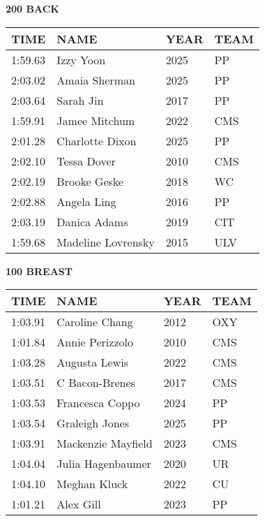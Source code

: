 \begin{table}[H]
\centering
\begin{minipage}[t]{0.48\textwidth}
\centering
\textbf{200 BACK}\\[0.1cm]
\begin{tabular}{@{}p{1.8cm}p{2.8cm}p{1.2cm}p{1.4cm}@{}}
\hline
    \textbf{TIME} & \textbf{NAME} & \textbf{YEAR} & \textbf{TEAM} \\
\hline
    1:59.63 & Izzy Yoon & 2025 & PP \\
    2:03.02 & Amaia Sherman & 2025 & PP \\
    2:03.64 & Sarah Jin & 2017 & PP \\
    1:59.91 & Jamee Mitchum & 2022 & CMS \\
    2:01.28 & Charlotte Dixon & 2025 & PP \\
    2:02.10 & Tessa Dover & 2010 & CMS \\
    2:02.19 & Brooke Geske & 2018 & WC \\
    2:02.88 & Angela Ling & 2016 & PP \\
    2:03.19 & Danica Adams & 2019 & CIT \\
    1:59.68 & Madeline Lovrensky & 2015 & ULV \\
\hline
\end{tabular}
\end{minipage}\hfill
\begin{minipage}[t]{0.48\textwidth}
\centering
\textbf{100 BREAST}\\[0.1cm]
\begin{tabular}{@{}p{1.8cm}p{2.8cm}p{1.2cm}p{1.4cm}@{}}
\hline
    \textbf{TIME} & \textbf{NAME} & \textbf{YEAR} & \textbf{TEAM} \\
\hline
    1:03.91 & Caroline Chang & 2012 & OXY \\
    1:01.84 & Annie Perizzolo & 2010 & CMS \\
    1:03.28 & Augusta Lewis & 2022 & CMS \\
    1:03.51 & C Bacon-Brenes & 2017 & CMS \\
    1:03.53 & Francesca Coppo & 2024 & PP \\
    1:03.54 & Graleigh Jones & 2025 & PP \\
    1:03.91 & Mackenzie Mayfield & 2023 & CMS \\
    1:04.04 & Julia Hagenbaumer & 2020 & UR \\
    1:04.10 & Meghan Kluck & 2022 & CU \\
    1:01.21 & Alex Gill & 2023 & PP \\
\hline
\end{tabular}
\end{minipage}
\end{table}

